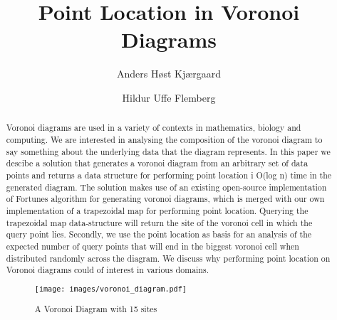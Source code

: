 \documentclass[oribibl]{llncs}
\begin{document}

\mainmatter              %
\title{Point Location in Voronoi Diagrams}

\author{Anders Høst Kjærgaard \and Hildur Uffe Flemberg\\
}



\maketitle              %

\begin{abstract}
Voronoi diagrams are used in a variety of contexts in mathematics, biology and computing. We are interested in analysing the composition of the voronoi diagram to say something  about the underlying data that the diagram represents. In this paper we descibe a solution that generates a voronoi diagram from an arbitrary set of data points and returns a data structure for performing point location i O(log n) time in the generated diagram. The solution makes use of an existing open-source implementation of Fortunes algorithm for generating voronoi diagrams, which is merged with our own implementation of a trapezoidal map for performing point location. Querying the trapezoidal map data-structure will return the site of the voronoi cell in which the query point lies.  Secondly, we use the point location as basis for an analysis of the expected number of query points that will end in the biggest voronoi cell when distributed randomly across the diagram. We discuss why performing point location on Voronoi diagrams could of interest in various domains.

\begin{figure}[t]
    \centering
      \texttt{[image: images/voronoi\_diagram.pdf]}
    \caption{A Voronoi Diagram with 15 sites}
    \label{fig:Pipes2IFCWorkflow}
\end{figure}


\end{abstract}











\end{document}
